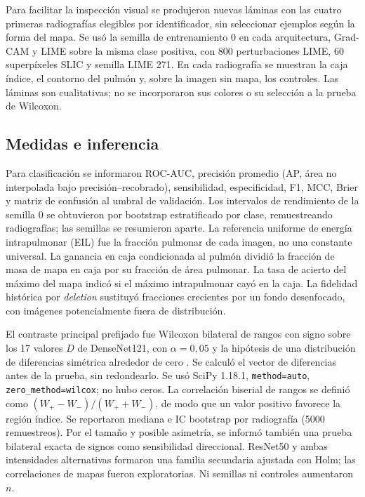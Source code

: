 \documentclass[conference]{IEEEtran}
\begin{document}
Para facilitar la inspección visual se produjeron nuevas láminas con las cuatro primeras radiografías elegibles por identificador, sin seleccionar ejemplos según la forma del mapa. Se usó la semilla de entrenamiento 0 en cada arquitectura, Grad-CAM y LIME sobre la misma clase positiva, con 800 perturbaciones LIME, 60 superpíxeles SLIC y semilla LIME 271. En cada radiografía se muestran la caja índice, el contorno del pulmón y, sobre la imagen sin mapa, los controles. Las láminas son cualitativas; no se incorporaron sus colores o su selección a la prueba de Wilcoxon.

\subsection{Medidas e inferencia}
Para clasificación se informaron ROC-AUC, precisión promedio (AP, área no interpolada bajo precisión--recobrado), sensibilidad, especificidad, F1, MCC, Brier y matriz de confusión al umbral de validación. Los intervalos de rendimiento de la semilla 0 se obtuvieron por bootstrap estratificado por clase, remuestreando radiografías; las semillas se resumieron aparte. La referencia uniforme de energía intrapulmonar (EIL) fue la fracción pulmonar de cada imagen, no una constante universal. La ganancia en caja condicionada al pulmón dividió la fracción de masa de mapa en caja por su fracción de área pulmonar. La tasa de acierto del máximo del mapa indicó si el máximo intrapulmonar cayó en la caja. La fidelidad histórica por \emph{deletion} sustituyó fracciones crecientes por un fondo desenfocado, con imágenes potencialmente fuera de distribución.

El contraste principal prefijado fue Wilcoxon bilateral de rangos con signo sobre los 17 valores $D$ de DenseNet121, con $\alpha=0,05$ y la hipótesis de una distribución de diferencias simétrica alrededor de cero \cite{scipywilcoxon}. Se calculó el vector de diferencias antes de la prueba, sin redondearlo. Se usó SciPy 1.18.1, \texttt{method=auto}, \texttt{zero\_method=wilcox}; no hubo ceros. La correlación biserial de rangos se definió como $(W_+-W_-)/(W_++W_-)$, de modo que un valor positivo favorece la región índice. Se reportaron mediana e IC bootstrap por radiografía (5000 remuestreos). Por el tamaño y posible asimetría, se informó también una prueba bilateral exacta de signos como sensibilidad direccional. ResNet50 y ambas intensidades alternativas formaron una familia secundaria ajustada con Holm; las correlaciones de mapas fueron exploratorias. Ni semillas ni controles aumentaron $n$.
\end{document}
